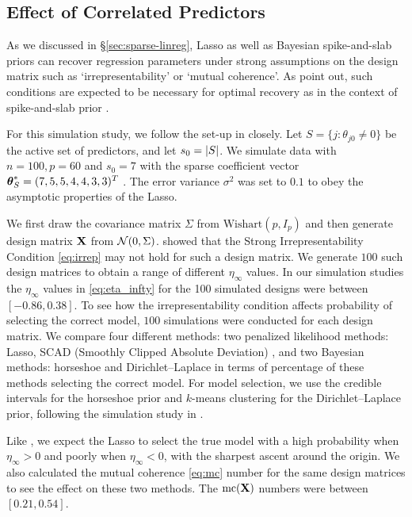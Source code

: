 \documentclass[sts,preprint]{imsart}
\begin{document}
\subsection{Effect of Correlated Predictors}

As we discussed in \S \ref{sec:sparse-linreg}, Lasso as well as Bayesian spike-and-slab priors can recover regression parameters under strong assumptions on the design matrix such as `irrepresentability' or `mutual coherence'. As \citet{van2017adaptive} point out, such conditions are expected to be necessary for optimal recovery as in the context of spike-and-slab prior \citep{castillo2015bayesian}. 

For this simulation study, we follow the set-up in \citet{zhao2006model} closely. Let $S = \{j : \theta_{j0} \ne 0 \}$ be the active set of predictors, and let $s_0 = \lvert S\rvert$. We simulate data with $n = 100, p = 60$ and $s_0 = 7$ with the sparse coefficient vector $\boldsymbol{\theta}_S^* = (7, 5, 5, 4, 4, 3, 3)^T$ . The error variance $\sigma^2$ was set to $0.1$ to obey the asymptotic properties of the Lasso. 


We first draw the covariance matrix $\Sigma$ from $\text{Wishart}(p, I_p)$ and then generate design matrix ${\bf X}$ from ${\cal N}(0, \Sigma)$. \citet{zhao2006model} showed that the Strong Irrepresentability Condition \eqref{eq:irrep} may not hold for such a design matrix. We generate $100$ such design matrices to obtain a range of different $\eta_{\infty}$ values. In our simulation studies the $\eta_{\infty}$ values in \eqref{eq:eta_infty} for the 100 simulated designs were between $[-0.86, 0.38]$. To see how the irrepresentability condition affects probability of selecting the correct model, $100$ simulations were conducted for each design matrix. We compare four different methods: two penalized likelihood methods: Lasso, SCAD (Smoothly Clipped Absolute Deviation) \citep{fan2001variable}, and two Bayesian methods: horseshoe and Dirichlet--Laplace \citep{bhattacharya2014dirichlet} in terms of percentage of these methods selecting the correct model. For model selection, we use the credible intervals for the horseshoe prior and $k$-means clustering for the Dirichlet--Laplace prior, following the simulation study in \citet{bhattacharya2014dirichlet}. 

Like \cite{zhao2006model}, we expect the Lasso to select the true model with a high probability when $\eta_{\infty} >0$ and poorly when $\eta_{\infty} < 0$, with the sharpest ascent around the origin. We also calculated the mutual coherence \eqref{eq:mc} number for the same design matrices to see the effect on these two methods. The $\text{mc}({\bf X})$ numbers were between $[0.21, 0.54]$. 
\end{document}
